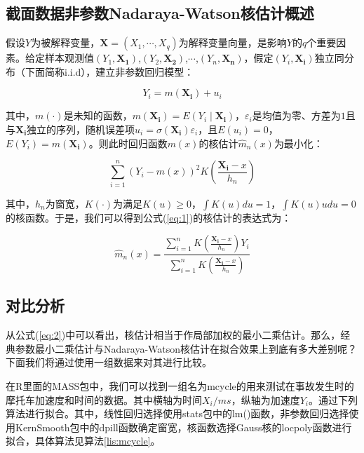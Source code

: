 \documentclass[12pt,a4paper,openany,twoside]{book}
\numberwithin{figure}{chapter}
\numberwithin{table}{chapter}
\numberwithin{equation}{chapter}
\begin{document}
\subsection{截面数据非参数Nadaraya-Watson核估计概述}

假设$Y$为被解释变量，$\boldsymbol{X}=\left(X_{1},\cdots,X_{q}\right)$为解释变量向量，是影响$Y$的$q$个重要因素。给定样本观测值$(Y_{1},\boldsymbol{X_{1}})$,$(Y_{2},\boldsymbol{X_{2}})$,$\cdots$,$(Y_{n},\boldsymbol{X_{n}})$，假定$(Y_{i},\boldsymbol{X_{i}})$独立同分布（下面简称i.i.d），建立非参数回归模型：

\begin{equation}
Y_{i}=m(\boldsymbol{X_{i}})+u_{i}
\end{equation}


其中，$m(\cdot)$是未知的函数，$m(\boldsymbol{X_{i}})=E(Y_{i}\mid\boldsymbol{X_{i}})$，$\varepsilon_{i}$是均值为零、方差为$1$且与$\boldsymbol{X_{i}}$独立的序列，随机误差项$u_{i}=\sigma(\boldsymbol{X_{i}})\varepsilon_{i}$，且$E(u_{i})=0$，$E(Y_{i})=m(\boldsymbol{X_{i}})$。则此时回归函数$m(x)$的核估计$\hat{m}_{n}(x)$为最小化：

\begin{equation}
\sum_{i=1}^{n}\left(Y_{i}-m(x)\right)^{2}K\left(\frac{\boldsymbol{X_{i}}-x}{h_{n}}\right)\label{eq:1}
\end{equation}


其中，$h_{n}$为窗宽，$K\left(\cdot\right)$为满足$K\left(u\right)\geq0$，$\int K\left(u\right)du=1$，$\int K\left(u\right)udu=0$的核函数。于是，我们可以得到公式(\ref{eq:1})的核估计的表达式为：

\begin{equation}
\hat{m}_{n}\left(x\right)=\frac{\sum_{i=1}^{n}K\left(\frac{\boldsymbol{X_{i}}-x}{h_{n}}\right)Y_{i}}{\sum_{i=1}^{n}K\left(\frac{\boldsymbol{X_{i}}-x}{h_{n}}\right)}\label{eq:2}
\end{equation}



\subsection{对比分析}

从公式(\ref{eq:2})中可以看出，核估计相当于作局部加权的最小二乘估计。那么，经典参数最小二乘估计与Nadaraya-Watson核估计在拟合效果上到底有多大差别呢？下面我们将通过使用一组数据来对其进行比较。

在R里面的MASS包中，我们可以找到一组名为mcycle的用来测试在事故发生时的摩托车加速度和时间的数据\cite{mcycle}。其中横轴为时间$X_{i}/ms$，纵轴为加速度$Y_{i}$。通过下列算法进行拟合。其中，线性回归选择使用stats包中的lm()函数，非参数回归选择使用KernSmooth包中的dpill函数确定窗宽，核函数选择Gauss核的locpoly函数进行拟合，具体算法见算法\ref{lis:mcycle}。
\end{document}
